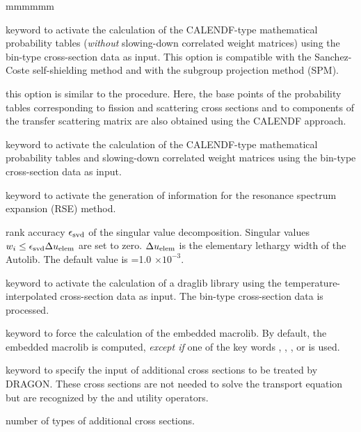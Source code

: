 \begin{ListeDeDescription}{mmmmmm}
\item[\moc{PT}] keyword to activate the calculation of the CALENDF-type
mathematical probability tables ({\sl without} slowing-down correlated weight matrices)
using the bin-type cross-section data as input.\cite{pt} This option is
compatible with the Sanchez-Coste self-shielding method and with the subgroup projection method (SPM).\cite{SPM09}

\item[\moc{PTMC}] this option is similar to the  procedure. Here, the base points of the probability tables corresponding
to fission and scattering cross sections and to components of the transfer scattering matrix are also obtained using the CALENDF approach.

\item[\moc{PTSL}] keyword to activate the calculation of the CALENDF-type
mathematical probability tables and slowing-down correlated weight matrices
using the bin-type cross-section data as input.\cite{nse2004}

\item[\moc{RSE}] keyword to activate the generation of information for the resonance spectrum expansion (RSE) method.\cite{rse2021}

\item[\dusa{svdeps}] rank accuracy $\epsilon_{\rm svd}$ of the singular value decomposition. Singular values $w_i \le \epsilon_{\rm svd}\Delta u_{\rm elem}$ are set to zero.
$\Delta u_{\rm elem}$ is the elementary lethargy width of the Autolib. The default value is =1.0 $\times 10^{-3}$.

\item[\moc{NEWL}] keyword to activate the calculation of a {\sc draglib} library
using the temperature-interpo\-la\-ted cross-section data as input. The bin-type
cross-section data is processed.

\item[\moc{MACR}] keyword to force the calculation of the embedded
macrolib. By default, the embedded macrolib is computed, {\sl except if} one of the
key words , , ,  or  is used.

\item[\moc{ADED}] keyword to specify the input of additional cross sections to
be treated by DRAGON. These cross sections are not needed to solve the transport
equation but are recognized by the  and utility operators.

\item[\dusa{nedit}] number of types of additional cross sections.


\end{ListeDeDescription}
